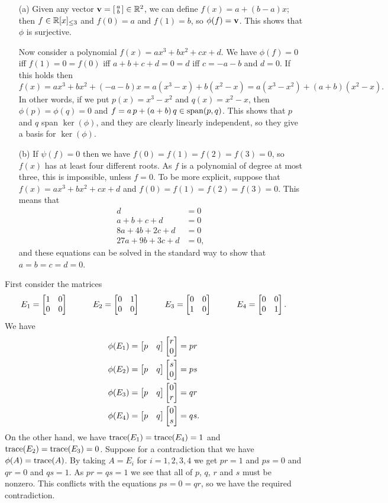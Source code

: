  \begin{itemize}
  \item[(a)] Given any vector $\mathbf{v}=\left[\begin{smallmatrix} a\\ b\end{smallmatrix}\right]\in{\mathbb{R}}^2$,
   we can define $f(x)=a+(b-a)x$; then $f\in{\mathbb{R}}[x]_{\leq 3}$
   and $f(0)=a$ and $f(1)=b$, so $\phi(f)=\mathbf{v}$.  This shows
   that $\phi$ is surjective.

   Now consider a polynomial $f(x)=ax^3+bx^2+cx+d$.
   We have $\phi(f)=0$ iff $f(1)=0=f(0)$ iff $a+b+c+d=0=d$
   iff $c=-a-b$ and $d=0$.  If this holds then
   \[ f(x) = ax^3 + bx^2 + (-a-b)x = a(x^3-x) + b(x^2-x)
       = a(x^3-x^2) + (a+b)(x^2-x).
   \]
   In other words, if we put $p(x)=x^3-x^2$ and
   $q(x)=x^2-x$, then $\phi(p)=\phi(q)=0$ and
   $f=a\,p+(a+b)\,q\in\operatorname{span}(p,q)$.  This shows that $p$ and
   $q$ span $\ker(\phi)$, and they are clearly linearly
   independent, so they give a basis for $\ker(\phi)$.
  \item[(b)] If $\psi(f)=0$ then we have
   $f(0)=f(1)=f(2)=f(3)=0$, so $f(x)$ has at least four
   different roots.  As $f$ is a polynomial of degree at
   most three, this is impossible, unless $f=0$.  To be more
   explicit, suppose that $f(x)=ax^3+bx^2+cx+d$ and
   $f(0)=f(1)=f(2)=f(3)=0$.  This means that
   \begin{align*}
    d &= 0 \\
    a+b+c+d &= 0 \\
    8a+4b+2c+d &= 0 \\
    27a+9b+3c+d &= 0,
   \end{align*}
   and these equations can be solved in the standard way to
   show that $a=b=c=d=0$.
 \end{itemize}
\EndDeferredSolution

 First consider the matrices
 \[ E_1 = \left[\begin{matrix} 1&0\\0&0 \end{matrix}\right] \hspace{3em}
    E_2 = \left[\begin{matrix} 0&1\\0&0 \end{matrix}\right] \hspace{3em}
    E_3 = \left[\begin{matrix} 0&0\\1&0 \end{matrix}\right] \hspace{3em}
    E_4 = \left[\begin{matrix} 0&0\\0&1 \end{matrix}\right].
 \]
 We have
 \begin{align*}
  \phi(E_1) &= \left[\begin{matrix} p&q\end{matrix}\right]\left[\begin{matrix} r \\ 0\end{matrix}\right] = pr \\
  \phi(E_2) &= \left[\begin{matrix} p&q\end{matrix}\right]\left[\begin{matrix} s \\ 0\end{matrix}\right] = ps \\
  \phi(E_3) &= \left[\begin{matrix} p&q\end{matrix}\right]\left[\begin{matrix} 0 \\ r\end{matrix}\right] = qr \\
  \phi(E_4) &= \left[\begin{matrix} p&q\end{matrix}\right]\left[\begin{matrix} 0 \\ s\end{matrix}\right] = qs.
 \end{align*}
 On the other hand, we have $\operatorname{trace}(E_1)=\operatorname{trace}(E_4)=1$ and
 $\operatorname{trace}(E_2)=\operatorname{trace}(E_3)=0$.  Suppose for a contradiction
 that we have $\phi(A)=\operatorname{trace}(A)$.  By taking $A=E_i$ for
 $i=1,2,3,4$ we get $pr=1$ and $ps=0$ and $qr=0$ and
 $qs=1$.  As $pr=qs=1$ we see that all of $p$, $q$, $r$ and
 $s$ must be nonzero.  This conflicts with the equations
 $ps=0=qr$, so we have the required contradiction.
\EndDeferredSolution

